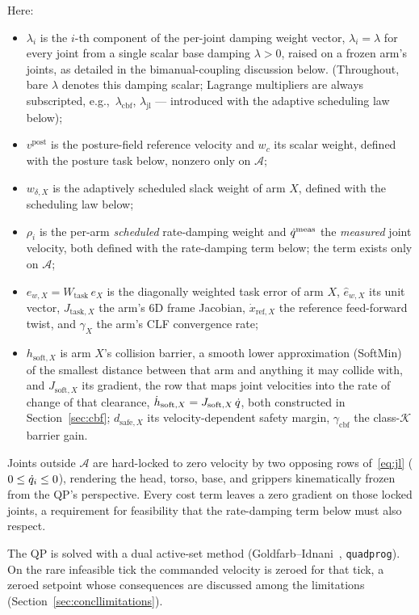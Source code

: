 Here:
\begin{itemize}[nosep]
\item $\lambda_i$ is the $i$-th component of the per-joint damping weight vector, $\lambda_i = \lambda$ for every joint from a single scalar base damping $\lambda > 0$, raised on a frozen arm's joints, as detailed in the bimanual-coupling discussion below. (Throughout, bare $\lambda$ denotes this damping scalar; Lagrange multipliers are always subscripted, e.g.,\ $\lambda_{\text{cbf}}$, $\lambda_{\text{jl}}$ --- introduced with the adaptive scheduling law below);
\item $v^{\text{post}}$ is the posture-field reference velocity and $w_c$ its scalar weight, defined with the posture task below, nonzero only on $\mathcal{A}$;
\item $w_{\delta,X}$ is the adaptively scheduled slack weight of arm $X$, defined with the scheduling law below;
\item $\rho_i$ is the per-arm \emph{scheduled} rate-damping weight and $\dot{q}^{\text{meas}}$ the \emph{measured} joint velocity, both defined with the rate-damping term below; the term exists only on $\mathcal{A}$;
\item $e_{w,X} = W_{\text{task}}\,e_X$ is the diagonally weighted task error of arm $X$, $\hat{e}_{w,X}$ its unit vector, $J_{\text{task},X}$ the arm's 6D frame Jacobian, $\dot{x}_{\text{ref},X}$ the reference feed-forward twist, and $\gamma_X$ the arm's CLF convergence rate;
\item $h_{\text{soft},X}$ is arm $X$'s collision barrier, a smooth lower approximation (SoftMin) of the smallest distance between that arm and anything it may collide with, and $J_{\text{soft},X}$ its gradient, the row that maps joint velocities into the rate of change of that clearance, $\dot{h}_{\text{soft},X} = J_{\text{soft},X}\,\dot{q}$, both constructed in Section~\ref{sec:cbf}; $d_{\text{safe},X}$ its velocity-dependent safety margin, $\gamma_{\text{cbf}}$ the class-$\mathcal{K}$ barrier gain.
\end{itemize}
Joints outside $\mathcal{A}$ are hard-locked to zero velocity by two opposing rows of~\eqref{eq:jl} ($0 \le \dot{q}_i \le 0$), rendering the head, torso, base, and grippers kinematically frozen from the QP's perspective. Every cost term leaves a zero gradient on those locked joints, a requirement for feasibility that the rate-damping term below must also respect.

The QP is solved with a dual active-set method (Goldfarb--Idnani~\cite{goldfarb1983}, \texttt{quadprog}). On the rare infeasible tick the commanded velocity is zeroed for that tick, a zeroed setpoint whose consequences are discussed among the limitations (Section~\ref{sec:concllimitations}).

